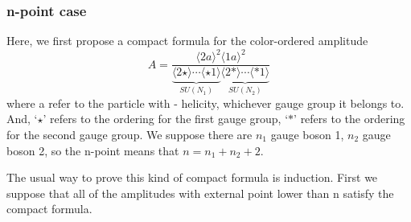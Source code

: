 \documentclass[12pt]{article}
\numberwithin{equation}{section}
\newcommand{\avg}[1]{\langle #1 \rangle}
\newcommand{\asqu}[1]{{\langle#1\rangle}^2}
\begin{document}
\subsubsection{n-point case}
Here, we first propose a compact formula for the color-ordered amplitude
\begin{equation}
    A=\frac{\asqu{2a}\!\asqu{1a}}{\underbrace{\avg{2\star}\cdots \avg{\star 1}}_{SU(N_1)}\underbrace{\avg{2\ast }\cdots \avg{\ast 1}}_{SU(N_2)}}
\end{equation}
where a refer to the particle with - helicity, whichever gauge group it belongs to. And, `$\star$' refers to the ordering for the first gauge group, `$\ast$'
refers to the ordering for the second gauge group. We suppose there are $n_1$ gauge boson 1, $n_2$ gauge boson 2, so the n-point means that $n=n_1+n_2+2$.
\par
The usual way to prove this kind of compact formula is induction. First we suppose that all of the amplitudes with external point lower than n satisfy the compact formula.
\end{document}
